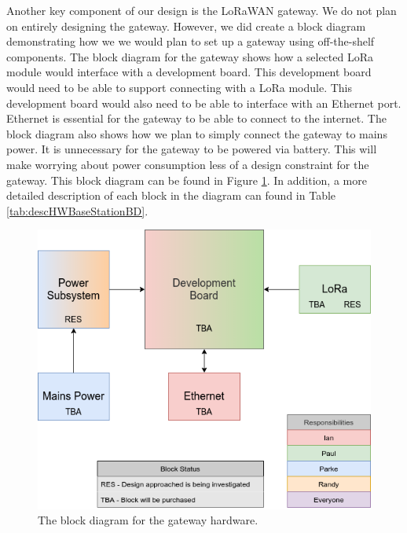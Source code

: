 Another key component of our design is the LoRaWAN gateway. We do not plan on entirely designing the gateway. However, we did create a block diagram demonstrating how we we would plan to set up a gateway using off-the-shelf components. The block diagram for the gateway shows how a selected LoRa module would interface with a development board. This development board would need to be able to support connecting with a LoRa module. This development board would also need to be able to interface with an Ethernet port. Ethernet is essential for the gateway to be able to connect to the internet. The block diagram also shows how we plan to simply connect the gateway to mains power. It is unnecessary for the gateway to be powered via battery. This will make worrying about power consumption less of a design constraint for the gateway. This block diagram can be found in Figure \ref{fig:hwBaseStationBD}. In addition, a more detailed description of each block in the diagram can found in Table \ref{tab:descHWBaseStationBD}.

\begin{figure}[H]
    \centering
    \includegraphics[width=5.3in]{"./figures/hwGatewayBD.png"} 
    \caption{The block diagram for the gateway hardware.}
    \label{fig:hwBaseStationBD}
\end{figure}

